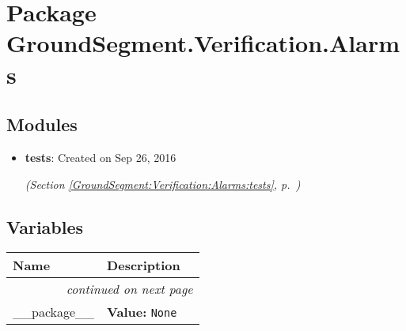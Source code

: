%
%
%


\section{Package GroundSegment.Verification.Alarms}

    \label{GroundSegment:Verification:Alarms}


\subsection{Modules}

\begin{itemize}
\setlength{\parskip}{0ex}
\item \textbf{tests}: Created on Sep 26, 2016



  \textit{(Section \ref{GroundSegment:Verification:Alarms:tests}, p.~\pageref{GroundSegment:Verification:Alarms:tests})}

\end{itemize}



  \subsection{Variables}

    \vspace{-1cm}
\hspace{\varindent}\begin{longtable}{|p{\varnamewidth}|p{\vardescrwidth}|l}
\cline{1-2}
\cline{1-2} \centering \textbf{Name} & \centering \textbf{Description}& \\
\cline{1-2}
\endhead\cline{1-2}\multicolumn{3}{r}{\small\textit{continued on next page}}\\\endfoot\cline{1-2}
\endlastfoot\raggedright \_\-\_\-p\-a\-c\-k\-a\-g\-e\-\_\-\_\- & \raggedright \textbf{Value:} 
{\tt None}&\\
\cline{1-2}
\end{longtable}

